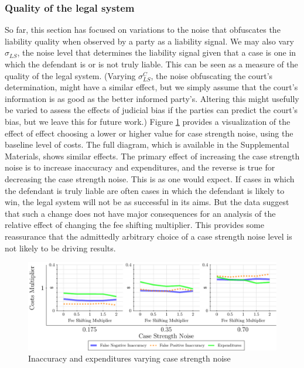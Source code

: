 \documentclass{article}
\begin{document}
\subsubsection{Quality of the legal system}

So far, this section has focused on variations to the noise that obfuscates the liability quality when observed by a party as a liability signal. We may also vary $\sigma_{LS}$, the noise level that determines the liability signal given that a case is one in which the defendant is or is not truly liable. This can be seen as a measure of the quality of the legal system. (Varying $\sigma_{LS}^C$, the noise obfuscating the court's determination, might have a similar effect, but we simply assume that the court's information is as good as the better informed party's. Altering this might usefully be varied to assess the effects of judicial bias if the parties can predict the court's bias, but we leave this for future work.)  Figure \ref{fig:accexp_qualitylegalsystem} provides a visualization of the effect of effect choosing a lower or higher value for case strength noise, using the baseline level of costs. The full diagram, which is available in the Supplemental Materials, shows similar effects. The primary effect of increasing the case strength noise is to increase inaccuracy and expenditures, and the reverse is true for decreasing the case strength noise. This is as one would expect. If cases in which the defendant is truly liable are often cases in which the defendant is likely to win, the legal system will not be as successful in its aims. But the data suggest that such a change does not have major consequences for an analysis of the relative effect of changing the fee shifting multiplier. This provides some reassurance that the admittedly arbitrary choice of a case strength noise level is not likely to be driving results.

\begin{figure}[h!]
\centering
\includegraphics[scale=0.50, trim={0in 0in 0in 0in}, clip]{../Figures/Accuracy and Expenditures Varying Case Strength Noise Costs 1.pdf}
\caption{Inaccuracy and expenditures varying case strength noise}
\label{fig:accexp_qualitylegalsystem}
\end{figure}
\end{document}
